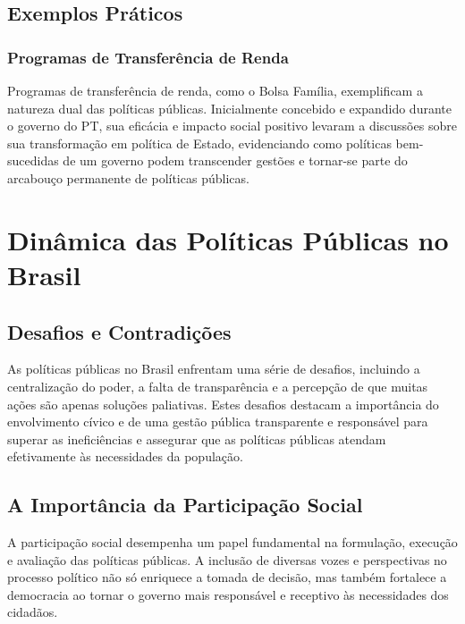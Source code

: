 \documentclass[
   article,       
   12pt,          
   oneside,       
   a4paper,       
   english,       
   brazil,        
   sumario=tradicional
   ]{abntex2}
\begin{document}
    \subsection{Exemplos Práticos}
        \subsubsection{Programas de Transferência de Renda}
            Programas de transferência de renda, como o Bolsa Família, exemplificam a natureza dual das políticas públicas. Inicialmente concebido e expandido durante o governo do PT, sua eficácia e impacto social positivo levaram a discussões sobre sua transformação em política de Estado, evidenciando como políticas bem-sucedidas de um governo podem transcender gestões e tornar-se parte do arcabouço permanente de políticas públicas.
            
\section{Dinâmica das Políticas Públicas no Brasil}
    \subsection{Desafios e Contradições}
        As políticas públicas no Brasil enfrentam uma série de desafios, incluindo a centralização do poder, a falta de transparência e a percepção de que muitas ações são apenas soluções paliativas. Estes desafios destacam a importância do envolvimento cívico e de uma gestão pública transparente e responsável para superar as ineficiências e assegurar que as políticas públicas atendam efetivamente às necessidades da população.
        
    \subsection{A Importância da Participação Social}
        A participação social desempenha um papel fundamental na formulação, execução e avaliação das políticas públicas. A inclusão de diversas vozes e perspectivas no processo político não só enriquece a tomada de decisão, mas também fortalece a democracia ao tornar o governo mais responsável e receptivo às necessidades dos cidadãos.
        
\end{document}
